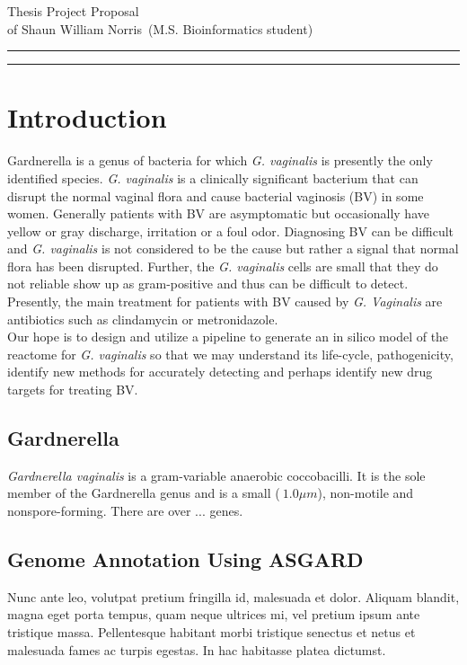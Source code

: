 \documentclass{article}
\newcommand{\soptitle}{Thesis Project Proposal}
\newcommand{\yourname}{Shaun William Norris}
\begin{document}
\begin{center}\LARGE\soptitle\\
\large of \yourname\ (M.S. Bioinformatics student)
\end{center}

\hrule
\vspace{1pt}
\hrule height 1pt

\bigskip

\section{Introduction}
Gardnerella is a genus of bacteria for which \textit{G. vaginalis} is presently the only identified species. \textit{G. vaginalis} is a clinically significant bacterium that can disrupt the normal vaginal flora and cause bacterial vaginosis (BV) in some women. Generally patients with BV are asymptomatic but occasionally have yellow or gray discharge, irritation or a foul odor. Diagnosing BV can be difficult and \textit{G. vaginalis} is not considered to be the cause but rather a signal that normal flora has been disrupted. Further, the \textit{G. vaginalis} cells are small that they do not reliable show up as gram-positive and thus can be difficult to detect. Presently, the main treatment for patients with BV caused by \textit{G. Vaginalis} are antibiotics such as clindamycin or metronidazole.\\ \newline
Our hope is to design and utilize a pipeline to generate an in silico model of the reactome for \textit{G. vaginalis} so that we may understand its life-cycle, pathogenicity, identify new methods for accurately detecting and perhaps identify new drug targets for treating BV.
\subsection{Gardnerella}

\textit{Gardnerella vaginalis} is a gram-variable anaerobic coccobacilli. It is the sole member of the Gardnerella genus and is a small (\(~1.0  \mu m\)), non-motile and nonspore-forming. There are over ... genes.

\subsection{Genome Annotation Using ASGARD}

Nunc ante leo, volutpat
pretium fringilla id, malesuada et dolor. Aliquam blandit, magna eget
porta tempus, quam neque ultrices mi, vel pretium ipsum ante tristique
massa. Pellentesque habitant morbi tristique senectus et netus et
malesuada fames ac turpis egestas. In hac habitasse platea dictumst.
\end{document}
